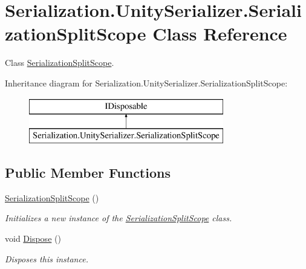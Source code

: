 \hypertarget{class_serialization_1_1_unity_serializer_1_1_serialization_split_scope}{}\section{Serialization.\+Unity\+Serializer.\+Serialization\+Split\+Scope Class Reference}
\label{class_serialization_1_1_unity_serializer_1_1_serialization_split_scope}


Class \hyperlink{class_serialization_1_1_unity_serializer_1_1_serialization_split_scope}{Serialization\+Split\+Scope}.  


Inheritance diagram for Serialization.\+Unity\+Serializer.\+Serialization\+Split\+Scope\+:\begin{figure}[H]
\begin{center}
\leavevmode
\includegraphics[height=2.000000cm]{class_serialization_1_1_unity_serializer_1_1_serialization_split_scope}
\end{center}
\end{figure}
\subsection*{Public Member Functions}
\begin{DoxyCompactItemize}
\item 
\hyperlink{class_serialization_1_1_unity_serializer_1_1_serialization_split_scope_ab81fd662776dd34489600773d4cb8ee1}{Serialization\+Split\+Scope} ()
\begin{DoxyCompactList}\small\item\em Initializes a new instance of the \hyperlink{class_serialization_1_1_unity_serializer_1_1_serialization_split_scope}{Serialization\+Split\+Scope} class. \end{DoxyCompactList}\item 
void \hyperlink{class_serialization_1_1_unity_serializer_1_1_serialization_split_scope_ab009e8b5901075212d6f4b2cc830711e}{Dispose} ()
\begin{DoxyCompactList}\small\item\em Disposes this instance. \end{DoxyCompactList}\end{DoxyCompactItemize}



